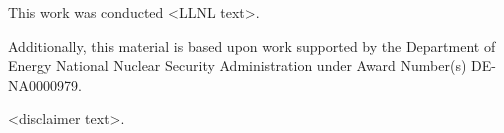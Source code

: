 
This work was conducted <LLNL text>.

Additionally, this material is based upon work supported by the Department of 
Energy National Nuclear Security Administration under Award Number(s) 
DE-NA0000979. %

<disclaimer text>.

